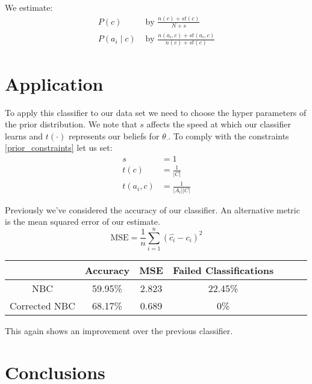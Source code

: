 We estimate:
\begin{align}
	P(c) & \text{ by } \frac{n(c) + st(c)}{N + s} \\
	P(a_i \mid c) & \text{ by } \frac{n(a_i, c) + st(a_i, c)}{n(c) + st(c)}
\end{align}

\section{Application}

To apply this classifier to our data set we need to choose the hyper parameters of the prior distribution.
We note that $s$ affects the speed at which our classifier learns and $t(\cdot)$ represents our beliefs for $\theta_\cdot$.
To comply with the constraints \ref{prior_constraints} let us set:
\begin{align}
	s & = 1 \\
	t(c) & = \frac{1}{|C|} \\
	t(a_i, c) & = \frac{1}{|A_i||C|}
\end{align}

Previously we've considered the accuracy of our classifier.
An alternative metric is the mean squared error of our estimate.
\begin{equation}
	\text{MSE} = \frac{1}{n}\sum_{i=1}^n(\hat{c_i} - c_i)^2
\end{equation}

\begin{center}
	\begin{tabular}{ c|c c c c c c }
		              & Accuracy & MSE   & Failed Classifications\\
		\hline
		NBC           & 59.95\%  & 2.823 & 22.45\% \\
		Corrected NBC & 68.17\%  & 0.689 & 0\%
	\end{tabular}
\end{center}

This again shows an improvement over the previous classifier.

\section{Conclusions}